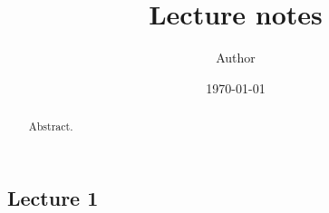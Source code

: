 \documentclass[11pt, reqno]{article}
\title{Lecture notes}
\author{Author}
\date{\today}
\begin{document}
\maketitle

\begin{abstract}
    Abstract.
\end{abstract}

\tableofcontents

\begin{adjustwidth}{5cm}{0cm} %
%
\section{Lecture 1}

%
\end{adjustwidth}

\nocite{*} %


\end{document}
